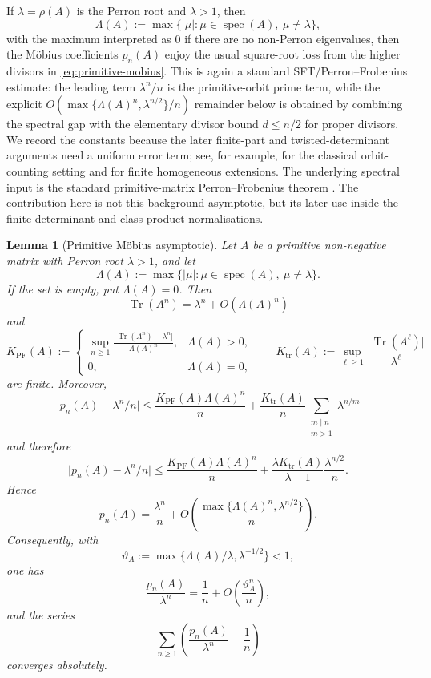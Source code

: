\documentclass[11pt,a4paper]{amsart}
\theoremstyle{plain}
\newtheorem{lemma}[theorem]{Lemma}
\theoremstyle{definition}
\theoremstyle{remark}
\DeclareMathOperator{\Tr}{Tr}
\DeclareMathOperator{\spec}{spec}
\newcommand{\abs}[1]{\lvert #1 \rvert}
\begin{document}
If \(\lambda=\rho(A)\) is the Perron root and \(\lambda>1\), then
\[
  \Lambda(A):=\max\{|\mu|:\mu\in\spec(A),\ \mu\neq\lambda\},
\]
with the maximum interpreted as \(0\) if there are no non-Perron
eigenvalues,
then the M\"obius coefficients \(p_n(A)\) enjoy the usual square-root
loss from the higher divisors in \eqref{eq:primitive-mobius}.  This is
again a standard SFT/Perron--Frobenius estimate: the leading term
\(\lambda^n/n\) is the primitive-orbit prime term, while the explicit
\(O(\max\{\Lambda(A)^n,\lambda^{n/2}\}/n)\) remainder below is obtained by
combining the spectral gap with the elementary divisor bound
\(d\le n/2\) for proper divisors.  We record the constants because the
later finite-part and twisted-determinant arguments need a uniform error
term; see, for example,
\cite{Parry1983PrimeOrbit,LindMarcus1995,ParryPollicott1990Zeta} for the
classical orbit-counting setting and
\cite{NooraniParry1992ChebotarevShifts} for finite homogeneous extensions.
The underlying spectral input is the standard primitive-matrix
Perron--Frobenius theorem \cite{Seneta2006NonnegativeMatrices}.  The
contribution here is not this
background asymptotic, but its later use inside the finite determinant and
class-product normalisations.

\begin{lemma}[Primitive M\"obius asymptotic]
  \label{lem:primitive-orbit-asymptotic}
  Let \(A\) be a primitive non-negative matrix with Perron root
  \(\lambda>1\), and let
  \[
    \Lambda(A):=\max\{|\mu|:\mu\in\spec(A),\ \mu\neq\lambda\}.
  \]
  If the set is empty, put \(\Lambda(A)=0\).
  Then
  \[
    \Tr(A^n)=\lambda^n+O(\Lambda(A)^n)
  \]
  and
  \[
    K_{\mathrm{PF}}(A)
    :=
    \begin{cases}
      \displaystyle
      \sup_{n\ge 1}
        \frac{\abs{\Tr(A^n)-\lambda^n}}{\Lambda(A)^n},
      & \Lambda(A)>0, \\[2ex]
      0,
      & \Lambda(A)=0,
    \end{cases}
    \qquad
    K_{\mathrm{tr}}(A)
    :=
    \sup_{\ell\ge 1}\frac{\abs{\Tr(A^\ell)}}{\lambda^\ell}
  \]
  are finite. Moreover,
  \[
    \abs{p_n(A)-\lambda^n/n}
    \le
    \frac{K_{\mathrm{PF}}(A)\Lambda(A)^n}{n}
    +\frac{K_{\mathrm{tr}}(A)}{n}
      \sum_{\substack{m\mid n\\ m>1}}\lambda^{n/m}
  \]
  and therefore
  \[
    \abs{p_n(A)-\lambda^n/n}
    \le
    \frac{K_{\mathrm{PF}}(A)\Lambda(A)^n}{n}
    +\frac{\lambda K_{\mathrm{tr}}(A)}{\lambda-1}
      \frac{\lambda^{n/2}}{n}.
  \]
  Hence
  \[
    p_n(A)
    =
    \frac{\lambda^n}{n}
    +O\!\left(
      \frac{\max\{\Lambda(A)^n,\lambda^{n/2}\}}{n}
    \right).
  \]
  Consequently, with
  \[
    \vartheta_A:=\max\{\Lambda(A)/\lambda,\lambda^{-1/2}\}<1,
  \]
  one has
  \[
    \frac{p_n(A)}{\lambda^n}
    =
    \frac{1}{n}+O\!\left(\frac{\vartheta_A^n}{n}\right),
  \]
  and the series
  \[
    \sum_{n\ge 1}
      \left(\frac{p_n(A)}{\lambda^n}-\frac{1}{n}\right)
  \]
  converges absolutely.
\end{lemma}
\end{document}
